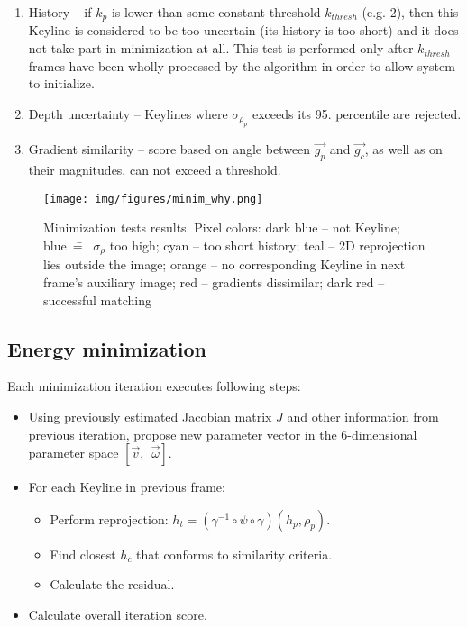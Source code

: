\begin{enumerate}
	\item History -- if $k_{p}$ is lower than some constant threshold $k_{thresh}$ (e.g. 2), then this Keyline is considered to be too uncertain (its history is too short) and it does not take part in minimization at all. This test is performed only after $k_{thresh}$ frames have been wholly processed by the algorithm in order to allow system to initialize.
	\item Depth uncertainty -- Keylines where $\sigma_{\rho_{p}}$ exceeds its 95. percentile are rejected.
	\item Gradient similarity -- score based on angle between $\vec{g_p}$ and $\vec{g_c}$, as well as on their magnitudes, can not exceed a threshold.
\end{enumerate}

\begin{figure}[ht]
	\centering\texttt{[image: img/figures/minim\_why.png]}
	\caption{ Minimization tests results. Pixel colors: dark blue -- not Keyline; blue~\==~ $\sigma_{\rho}$ too high; cyan -- too short history; teal -- 2D reprojection lies outside the image; orange -- no corresponding Keyline in next frame's auxiliary image; red -- gradients dissimilar; dark red -- successful matching }
	\label{fig:minim_why}
\end{figure}

\subsection{Energy minimization}
\label{sec:energyminim}

Each minimization iteration executes following steps:
\begin{itemize}
	\item Using previously estimated Jacobian matrix $J$ and other information from previous iteration, propose new parameter vector in the 6-dimensional parameter space $\left[ \vec{v},\ \ \vec{\omega} \right]$.
	\item For each Keyline in previous frame:
	\begin{itemize}
		\item Perform reprojection: $h_{t} = \left( \gamma^{-1} \circ \psi \circ \gamma \right) \left( h_p, \rho_{p} \right)$.
		\item Find closest $h_{c}$ that conforms to similarity criteria.
		\item Calculate the residual.
	\end{itemize}
	\item Calculate overall iteration score.
\end{itemize}

